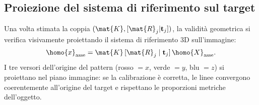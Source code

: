 \subsection{Proiezione del sistema di riferimento sul target}
\label{sub:assi}

Una volta stimata la coppia \((\mat{K},[\mat{R}_j|\mathbf{t}_j])\),
la validità geometrica si verifica visivamente proiettando il sistema
di riferimento 3D sull'immagine:
\[
  \homo{x}_\text{asse}
  = \mat{K}\,[\mat{R}_j\mid\mathbf{t}_j]\,\homo{X}_\text{asse}.
  \label{eq:assi_proj}
\]
I tre versori dell'origine del pattern (rosso \(=x\), verde \(=y\),
blu \(=z\)) si proiettano nel piano immagine: se la calibrazione è
corretta, le linee convergono coerentemente all'origine del target e
rispettano le proporzioni metriche dell'oggetto.